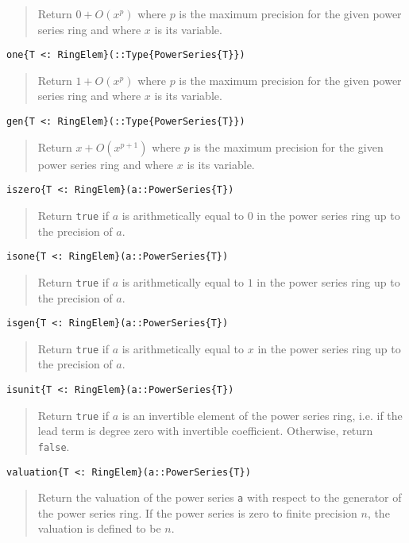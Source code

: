 \documentclass[a4paper,10pt]{article}
\newcommand{\code}{\lstinline}
\newcommand{\desc}[1]{\vspace{-3mm}\begin{quote}#1\end{quote}}
\begin{document}
\desc{Return $0 + O(x^p)$ where $p$ is the maximum precision for the
given power series ring and where $x$ is its variable.}

\begin{lstlisting}
one{T <: RingElem}(::Type{PowerSeries{T}})
\end{lstlisting}

\desc{Return $1 + O(x^p)$ where $p$ is the maximum precision for the
given power series ring and where $x$ is its variable.}

\begin{lstlisting}
gen{T <: RingElem}(::Type{PowerSeries{T}})
\end{lstlisting}

\desc{Return $x + O(x^{p+1})$ where $p$ is the maximum precision for the
given power series ring and where $x$ is its variable.}

\begin{lstlisting}
iszero{T <: RingElem}(a::PowerSeries{T})
\end{lstlisting}

\desc{Return \code{true} if $a$ is arithmetically equal to $0$ in the
power series ring up to the precision of $a$.}

\begin{lstlisting}
isone{T <: RingElem}(a::PowerSeries{T})
\end{lstlisting}

\desc{Return \code{true} if $a$ is arithmetically equal to $1$ in the
power series ring up to the precision of $a$.}

\begin{lstlisting}
isgen{T <: RingElem}(a::PowerSeries{T})
\end{lstlisting}

\desc{Return \code{true} if $a$ is arithmetically equal to $x$ in the
power series ring up to the precision of $a$.}

\begin{lstlisting}
isunit{T <: RingElem}(a::PowerSeries{T})
\end{lstlisting}

\desc{Return \code{true} if $a$ is an invertible element of the power series
ring, i.e. if the lead term is degree zero with invertible coefficient.
Otherwise, return \code{false}.}

\begin{lstlisting}
valuation{T <: RingElem}(a::PowerSeries{T})
\end{lstlisting}

\desc{Return the valuation of the power series \code{a} with respect to the
generator of the power series ring. If the power series is zero to finite
precision $n$, the valuation is defined to be $n$.}
\end{document}

